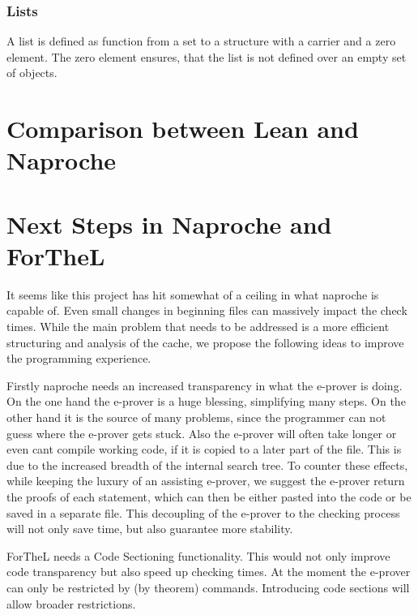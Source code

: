 \documentclass[11pt]{article}
\begin{document}
\subsubsection{Lists}

A list is defined as function from a set to a structure with a carrier and a zero element. The zero element ensures, that the list is not defined over an empty set of objects. 

\section{Comparison between Lean and Naproche}


\section{Next Steps in Naproche and ForTheL}

It seems like this project has hit somewhat of a ceiling in what naproche is capable of. 
Even small changes in beginning files can massively impact the check times.
While the main problem that needs to be addressed is a more efficient structuring and analysis of the cache, we propose the following ideas to improve the programming experience.

Firstly naproche needs an increased transparency in what the e-prover is doing. On the one hand the e-prover is a huge blessing, simplifying many steps. On the other hand it is the source of many problems, since the programmer can not guess where the e-prover gets stuck. Also the e-prover will often take longer or even cant compile working code, if it is copied to a later part of the file. This is due to the increased breadth of the internal search tree. To counter these effects, while keeping the luxury of an assisting e-prover, we suggest the e-prover return the proofs of each statement, which can then be either pasted into the code or be saved in a separate file. This decoupling of the e-prover to the checking process will not only save time, but also guarantee more stability.

ForTheL needs a Code Sectioning functionality. This would not only improve code transparency but also speed up checking times. At the moment the e-prover can only be restricted by (by theorem) commands. Introducing code sections will allow broader restrictions.
\end{document}
